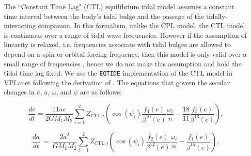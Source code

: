 \documentclass[twocolumn]{aastex61}
\newcommand{\eqtide}[0]{\texttt{EQTIDE}\xspace}
\begin{document}
The ``Constant Time Lag" (CTL) \citep[][]{Hut1981,Leconte2010} equilibrium tidal model assumes a constant time interval between the body's tidal bulge and the passage of the tidally-interacting companion. In this formalism, unlike the CPL model, the CTL model is continuous over a range of tidal wave frequencies.  However if the assumption of linearity is relaxed, i.e. frequencies associate with tidal bulges are allowed to depend on a spin or orbital forcing frequency, then this model is only valid over a small range of frequencies \citep{Greenberg2009}, hence we do not make this assumption and hold the tidal time lag fixed. We use the \eqtide implementation of the CTL model in VPLanet following the derivation of \citet{Leconte2010}.  The equations that govern the secular changes in $e$, $a$, $\omega$, and $\psi$ are as follows:

\begin{equation} \label{eqn:ctl:e}
  \frac{de}{dt} = \frac{11 ae}{2 G M_1 M_2}
  \sum_{i = 1}^2 Z_{\mathrm{CTL},i} \left( \cos(\psi_i) \frac{f_4(e)}{\beta^{10}(e)}  \frac{\omega_i}{n} -\frac{18}{11} \frac{f_3(e)}{\beta^{13}(e)}\right),
\end{equation}

\begin{equation}\label{eqn:ctl:a}
  \frac{da}{dt} \ = \  \frac{2 a^2}{G M_1 M_2}
  \sum\limits_{i = 1}^2 Z_{\mathrm{CTL},i} \left( \cos(\psi_i) \frac{f_2(e)}{\beta^{12}(e)} \frac{\omega_i}{n} - \frac{f_1(e)}{\beta^{15}(e)}\right),
\end{equation}
\end{document}
